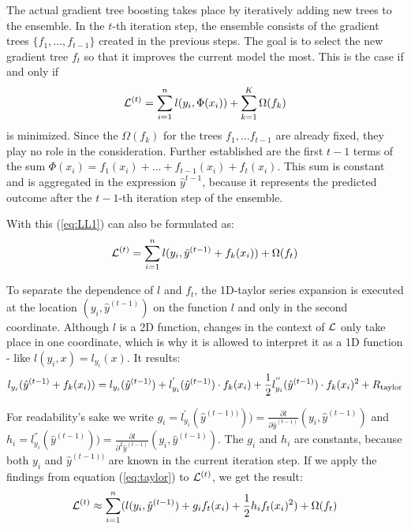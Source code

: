The actual gradient tree boosting takes place by iteratively adding new trees to the ensemble. In the $t$-th iteration step, the ensemble consists of the gradient trees $\{f_1, ... , f_{t-1}\}$ created in the previous steps. The goal is to select the new gradient tree $f_t$ so that it improves the current model the most. This is the case if and only if 
\begin{equation}
\mathcal{L}^{(t)} = \sum_{i=1}^{n} l(y_i, \Phi(x_i)) + \sum_{k=1}^{K}\Omega(f_k)
\label{eq:LL1}
\end{equation}
is minimized.
Since the $\Omega(f_k)$ for the trees $f_1, ... f_{t-1}$ are already fixed, they play no role in the consideration. Further established are the first $t-1$ terms of the sum $\Phi(x_i) = f_1(x_i) + ... + f_{t-1}(x_i) + f_t(x_i)$. This sum is constant and is aggregated in the expression $\hat{y}^{t-1}$, because it represents the predicted outcome after the $t-1$-th iteration step of the ensemble.

With this (\ref{eq:LL1}) can also be formulated as:
\begin{equation}
\mathcal{L}^{(t)} = \sum_{i=1}^{n} l(y_i, \hat{y}^{(t-1)} + f_k(x_i)) + \Omega(f_t)
\label{eq:LL2}
\end{equation}

To separate the dependence of $l$ and $f_t$, the 1D-taylor series expansion is executed at the location $(y_i,\hat{y}^{(t-1)})$ on the function $l$ and only in the second coordinate. Although $l$ is a 2D function, changes in the context of $\mathcal{L}$ only take place in one coordinate, which is why it is allowed to interpret it as a 1D function - like $l(y_i,x) = l_{y_i}(x)$. It results:
\begin{equation}
\label{eq:taylor}
l_{y_i}(\hat{y}^{(t-1)} + f_k(x_i)) = l_{y_i}(\hat{y}^{(t-1)}) + l_{y_i}^{'}(\hat{y}^{(t-1)}) \cdot f_k(x_i)
+ \newline \frac{1}{2} l_{y_i}^{''}(\hat{y}^{(t-1)}) \cdot f_k(x_i)^2 + R_\text{taylor}
\end{equation}

For readability's sake we write $g_i = l_{y_i}^{'}(\hat{y}^{(t-1))}) ) = \frac{\partial l}{\partial \hat{y}^{(t-1)}}(y_i,\hat{y}^{(t-1)})$ and $h_i = l_{y_i}^{''}(\hat{y}^{(t-1)}) ) = \frac{\partial l}{\partial^2 \hat{y}^{(t-1)}}(y_i,\hat{y}^{(t-1)})$. The $g_i$ and $h_i$ are constants, because both $y_i$ and $\hat{y}^{(t-1))}$ are known in the current iteration step. If we apply the findings from equation (\ref{eq:taylor}) to $\mathcal{L}^{(t)}$, we get the result:
\begin{equation} \label{eq:shortL}
\mathcal{L}^{(t)} \approx \sum_{i=1}^{n} (l(y_i,\hat{y}^{(t-1)}) + g_if_t(x_i) + \frac{1}{2} h_i f_t(x_i)^2) + \Omega(f_t)
\end{equation}

